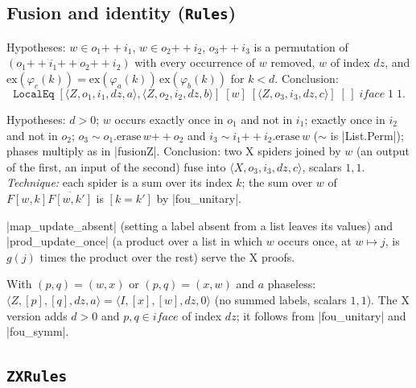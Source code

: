 \subsection{Fusion and identity (\texttt{Rules})}

\begin{lemma}
Hypotheses: $w\in o_1\mathbin{+\!\!+}i_1$, $w\in o_2\mathbin{+\!\!+}i_2$, $o_3\mathbin{+\!\!+}i_3$ is a
permutation of $(o_1\mathbin{+\!\!+}i_1\mathbin{+\!\!+}o_2\mathbin{+\!\!+}i_2)$ with every occurrence of $w$
removed, $w$ of index $dz$, and $\mathrm{ex}(\varphi_c(k))=\mathrm{ex}(\varphi_a(k))\,\mathrm{ex}(\varphi_b(k))$ for
$k<d$. Conclusion:
\[\mathtt{LocalEq}\;[\langle Z,o_1,i_1,dz,a\rangle,\langle Z,o_2,i_2,dz,b\rangle]\;[w]\;
[\langle Z,o_3,i_3,dz,c\rangle]\;[\,]\;\mathit{iface}\;1\;1.\]
\end{lemma}

\begin{lemma}
Hypotheses: $d>0$; $w$ occurs exactly once in $o_1$ and not in $i_1$; exactly once in $i_2$ and not in
$o_2$; $o_3\sim o_1.\mathrm{erase}\,w\mathbin{+\!\!+}o_2$ and $i_3\sim i_1\mathbin{+\!\!+}i_2.\mathrm{erase}\,w$
($\sim$ is \lean|List.Perm|); phases multiply as in \lean|fusionZ|. Conclusion: two X spiders joined
by $w$ (an output of the first, an input of the second) fuse into
$\langle X,o_3,i_3,dz,c\rangle$, scalars $1,1$. \emph{Technique:} each spider is a sum over its
index $k$; the sum over $w$ of $F[w,k]\overline{F[w,k']}$ is $[k=k']$ by \lean|fou_unitary|.
\end{lemma}

\lean|map_update_absent| (setting a label absent from a list leaves its values) and
\lean|prod_update_once| (a product over a list in which $w$ occurs once, at $w\mapsto j$, is $g(j)$
times the product over the rest) serve the X proofs.

\begin{lemma}
With $(p,q)=(w,x)$ or $(p,q)=(x,w)$ and $a$ phaseless:
$\langle Z,[p],[q],dz,a\rangle=\langle I,[x],[w],dz,0\rangle$ (no summed labels, scalars $1,1$).
The X version adds $d>0$ and $p,q\in\mathit{iface}$ of index $dz$; it follows from
\lean|fou_unitary| and \lean|fou_symm|.
\end{lemma}

\subsection{\texttt{ZXRules}}

